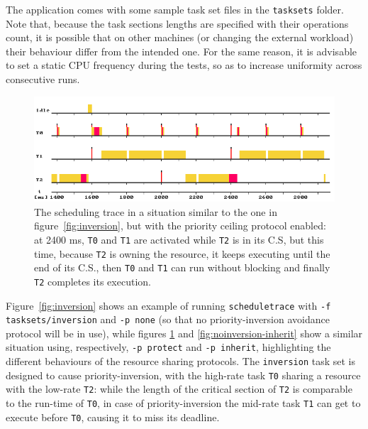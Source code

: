 \documentclass[paper=a4, fontsize=11pt]{scrartcl}
\newcommand{\mono}[1]{\texttt{#1}}
\numberwithin{equation}{section}        %
\numberwithin{figure}{section}          %
\numberwithin{table}{section}               %
\numberwithin{fragment}{section}
\begin{document}
The application comes with some sample task set files in the \mono{tasksets} folder. Note that, because the task sections lengths are specified with their operations count, it is possible that on other machines (or changing the external workload) their behaviour differ from the intended one. For the same reason, it is advisable to set a static CPU frequency during the tests, so as to increase uniformity across consecutive runs.

\begin{figure}
  \centering
  \includegraphics[width=1\textwidth]{img/noinversion_ceiling.png}
  \caption{\label{fig:noinversion-ceiling} The scheduling trace in a situation similar to the one in figure~\ref{fig:inversion}, but with the priority ceiling protocol enabled: at 2400 ms, \mono{T0} and \mono{T1} are activated while \mono{T2} is in its C.S, but this time, because \mono{T2} is owning the resource, it keeps executing until the end of its C.S., then \mono{T0} and \mono{T1} can run without blocking and finally \mono{T2} completes its execution.}
\end{figure}

Figure~\ref{fig:inversion} shows an example of running \mono{scheduletrace} with \mono{-f tasksets/inversion} and \mono{-p none} (so that no priority-inversion avoidance protocol will be in use), while figures \ref{fig:noinversion-ceiling} and \ref{fig:noinversion-inherit} show a similar situation using, respectively, \mono{-p protect} and \mono{-p inherit}, highlighting the different behaviours of the resource sharing protocols. The \mono{inversion} task set is designed to cause priority-inversion, with the high-rate task \mono{T0} sharing a resource with the low-rate \mono{T2}: while the length of the critical section of \mono{T2} is comparable to the run-time of \mono{T0}, in case of priority-inversion the mid-rate task \mono{T1} can get to execute before \mono{T0}, causing it to miss its deadline.
\end{document}
